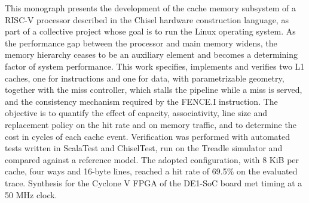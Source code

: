 This monograph presents the development of the cache memory subsystem of a RISC-V processor described in the Chisel hardware construction language, as part of a collective project whose goal is to run the Linux operating system. As the performance gap between the processor and main memory widens, the memory hierarchy ceases to be an auxiliary element and becomes a determining factor of system performance. This work specifies, implements and verifies two L1 caches, one for instructions and one for data, with parametrizable geometry, together with the miss controller, which stalls the pipeline while a miss is served, and the consistency mechanism required by the FENCE.I instruction. The objective is to quantify the effect of capacity, associativity, line size and replacement policy on the hit rate and on memory traffic, and to determine the cost in cycles of each cache event. Verification was performed with automated tests written in ScalaTest and ChiselTest, run on the Treadle simulator and compared against a reference model. The adopted configuration, with 8 KiB per cache, four ways and 16-byte lines, reached a hit rate of 69.5\% on the evaluated trace. Synthesis for the Cyclone V FPGA of the DE1-SoC board met timing at a 50 MHz clock.
